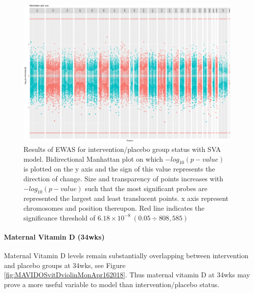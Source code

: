 \documentclass[
]{book}
\begin{document}
\begin{figure}

{\centering \includegraphics[width=0.8\linewidth]{figs/MAVIDOSccEPICewasManhattanSVA} 

}

\caption{Results of EWAS for intervention/placebo group status with SVA model. Bidirectional Manhattan plot on which \(-log_{10}(p-value)\) is plotted on the y axis and the sign of this value represents the direction of change. Size and transparency of points increases with \(-log_{10}(p-value)\) such that the most significant probes are represented the largest and least translucent points. x axis represent chromosomes and position thereupon. Red line indicates the significance threshold of \(6.18\times10^{-8}~(0.05\div808,585)\)}\label{fig:MAVIDOSccEPICewasManhattanSVA}
\end{figure}



\hypertarget{maternal-vitamin-d-34wks}{%
\paragraph{Maternal Vitamin D (34wks)}\label{maternal-vitamin-d-34wks}}

Maternal Vitamin D levels remain substantially overlapping between intervention and placebo groups at 34wks, see Figure \ref{fig:MAVIDOSvitDviolinMonApr162018}.
Thus maternal vitamin D at 34wks may prove a more useful variable to model than intervention/placebo status.
\end{document}

